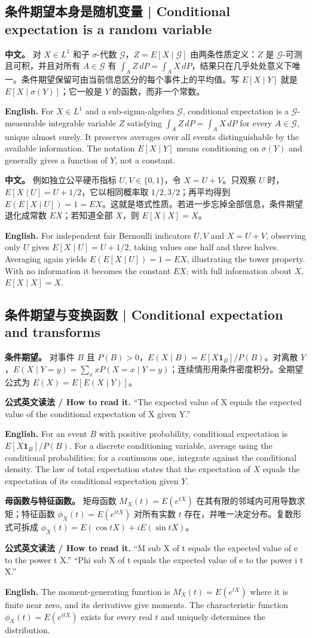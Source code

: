 \documentclass[UTF8,11pt,a4paper]{ctexart}
\newcommand{\EN}[1]{\par\noindent\textbf{English.} #1\par}
\newcommand{\READ}[1]{\par\noindent\textbf{公式英文读法 / How to read it.} #1\par}
\newcommand{\APS}[2]{\par\noindent\textbf{中文。} #1\par\noindent\textbf{English.} #2\par\smallskip}
\begin{document}
\subsection{条件期望本身是随机变量 | Conditional expectation is a random variable}
\APS{对 $X\in L^1$ 和子 $\sigma$-代数 $\mathcal G$，$Z=E[X\mid\mathcal G]$ 由两条性质定义：$Z$ 是 $\mathcal G$-可测且可积，并且对所有 $A\in\mathcal G$ 有 $\int_A Z\,dP=\int_A X\,dP$，结果只在几乎处处意义下唯一。条件期望保留可由当前信息区分的每个事件上的平均值。写 $E[X\mid Y]$ 就是 $E[X\mid\sigma(Y)]$；它一般是 $Y$ 的函数，而非一个常数。}{For $X\in L^1$ and a sub-sigma-algebra $\mathcal G$, conditional expectation is a $\mathcal G$-measurable integrable variable $Z$ satisfying $\int_A Z\,dP=\int_A X\,dP$ for every $A\in\mathcal G$, unique almost surely. It preserves averages over all events distinguishable by the available information. The notation $E[X\mid Y]$ means conditioning on $\sigma(Y)$ and generally gives a function of $Y$, not a constant.}
\APS{例如独立公平硬币指标 $U,V\in\{0,1\}$，令 $X=U+V$。只观察 $U$ 时，$E[X\mid U]=U+1/2$，它以相同概率取 $1/2,3/2$；再平均得到 $E(E[X\mid U])=1=EX$。这就是塔式性质。若进一步忘掉全部信息，条件期望退化成常数 $EX$；若知道全部 $X$，则 $E[X\mid X]=X$。}{For independent fair Bernoulli indicators $U,V$ and $X=U+V$, observing only $U$ gives $E[X\mid U]=U+1/2$, taking values one half and three halves. Averaging again yields $E(E[X\mid U])=1=EX$, illustrating the tower property. With no information it becomes the constant $EX$; with full information about $X$, $E[X\mid X]=X$.}

\subsection{条件期望与变换函数 | Conditional expectation and transforms}
\noindent\textbf{条件期望。} 对事件 $B$ 且 $P(B)>0$，$E(X\mid B)=E[X\mathbf1_B]/P(B)$。对离散 $Y$，$E(X\mid Y=y)=\sum_xxP(X=x\mid Y=y)$；连续情形用条件密度积分。全期望公式为 $E(X)=E[E(X\mid Y)]$。
\READ{“The expected value of X equals the expected value of the conditional expectation of X given Y.”}
\EN{For an event $B$ with positive probability, conditional expectation is $E[X\mathbf 1_B]/P(B)$. For a discrete conditioning variable, average using the conditional probabilities; for a continuous one, integrate against the conditional density. The law of total expectation states that the expectation of $X$ equals the expectation of its conditional expectation given $Y$.}

\noindent\textbf{母函数与特征函数。} 矩母函数 $M_X(t)=E(e^{tX})$ 在其有限的邻域内可用导数求矩；特征函数 $\phi_X(t)=E(e^{itX})$ 对所有实数 $t$ 存在，并唯一决定分布。复数形式可拆成 $\phi_X(t)=E(\cos tX)+iE(\sin tX)$。
\READ{“M sub X of t equals the expected value of e to the power t X.” “Phi sub X of t equals the expected value of e to the power i t X.”}
\EN{The moment-generating function is $M_X(t)=E(e^{tX})$ where it is finite near zero, and its derivatives give moments. The characteristic function $\phi_X(t)=E(e^{itX})$ exists for every real $t$ and uniquely determines the distribution.}
\end{document}
